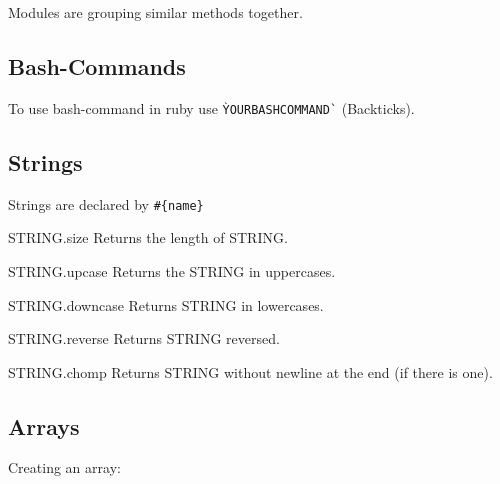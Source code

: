 \documentclass[10pt,a4paper]{scrartcl}
\begin{document}
Modules are grouping similar methods together.

\subsection{Bash-Commands}

To use bash-command in ruby use \texttt{\`YOURBASHCOMMAND\`} (Backticks).

\subsection{Strings}

Strings are declared by \verb$#{name}$

\begin{description}
	\item{STRING.size} Returns the length of STRING.
	\item{STRING.upcase} Returns the STRING in uppercases.
	\item{STRING.downcase} Returns STRING in lowercases.
	\item{STRING.reverse} Returns STRING reversed.
	\item{STRING.chomp} Returns STRING without newline at the end (if there is one).

\end{description}

\subsection{Arrays}
Creating an array:

\begin{terminalcode}
\end{terminalcode}
\end{document}
